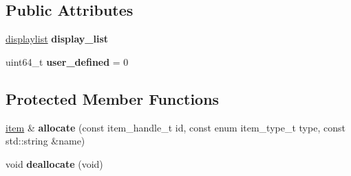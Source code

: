 \subsection*{Public Attributes}
\begin{DoxyCompactItemize}
\item 
\hypertarget{classDOSBoxMenu_1_1item_a22a843c9d2a6a27d0a77c079a7e59d79}{\hyperlink{classDOSBoxMenu_1_1displaylist}{displaylist} {\bfseries display\-\_\-list}}\label{classDOSBoxMenu_1_1item_a22a843c9d2a6a27d0a77c079a7e59d79}

\item 
\hypertarget{classDOSBoxMenu_1_1item_a4b00500eb6e5297c61f7afb5ba4526ff}{uint64\-\_\-t {\bfseries user\-\_\-defined} = 0}\label{classDOSBoxMenu_1_1item_a4b00500eb6e5297c61f7afb5ba4526ff}

\end{DoxyCompactItemize}
\subsection*{Protected Member Functions}
\begin{DoxyCompactItemize}
\item 
\hypertarget{classDOSBoxMenu_1_1item_a139da83095dbc672fd95e9d6fe2abe1e}{\hyperlink{classDOSBoxMenu_1_1item}{item} \& {\bfseries allocate} (const item\-\_\-handle\-\_\-t id, const enum item\-\_\-type\-\_\-t type, const std\-::string \&name)}\label{classDOSBoxMenu_1_1item_a139da83095dbc672fd95e9d6fe2abe1e}

\item 
\hypertarget{classDOSBoxMenu_1_1item_aedd2ca7c35a1a8e4bd3ede9c9dcc7213}{void {\bfseries deallocate} (void)}\label{classDOSBoxMenu_1_1item_aedd2ca7c35a1a8e4bd3ede9c9dcc7213}

\end{DoxyCompactItemize}
